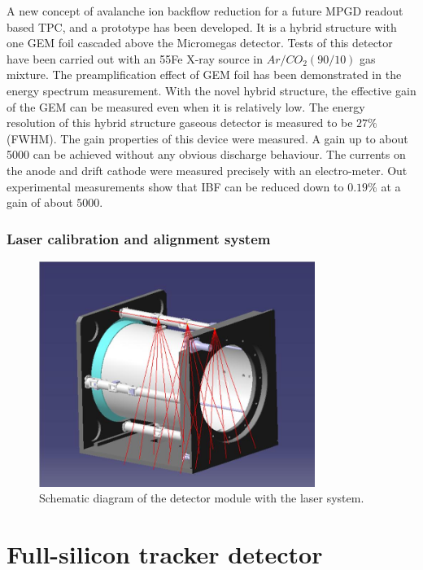 A new concept of avalanche ion backflow reduction for a future MPGD readout based TPC, and a prototype has been developed. It is a hybrid structure with one GEM foil cascaded above the Micromegas detector. Tests of this detector have been carried out with an 55Fe X-ray source
in $Ar/CO_2(90/10)$ gas mixture. The preamplification effect of GEM foil has been demonstrated in the energy spectrum measurement. With the novel hybrid structure, the effective gain of the GEM can be measured even when it is relatively low. The energy resolution of this hybrid structure gaseous detector is measured to be $27\%$(FWHM). The gain properties of this device were measured. A gain up to about 5000 can be achieved without any obvious discharge behaviour. The currents on the anode and drift cathode were measured precisely with an electro-meter. Out experimental measurements show that IBF can be reduced down to $0.19\%$ at a gain of about $5000$.

\subsubsection{Laser calibration and alignment system}
\begin{figure}[htbp]
\centering
\includegraphics[width=0.80\textwidth]{figures/TrackingSystem/TPC_laser_dig.jpg}
\caption{\label{fig:TPC_laser_dig} Schematic diagram of the detector module with the laser system.}
\end{figure}


\section{Full-silicon tracker detector}



